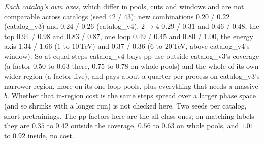 \documentclass[11pt]{article}
\begin{document}
\emph{Each catalog's own axes}, which differ in pools, cuts and windows and are not comparable across catalogs (seed
$42$ / $43$): new combinations $0.20$ / $0.22$ (catalog\_v3) and $0.24$ / $0.26$ (catalog\_v4), $2\to4$ $0.29$ /
$0.31$ and $0.46$ / $0.48$, the top $0.94$ / $0.98$ and $0.83$ / $0.87$, one loop $0.49$ / $0.45$ and $0.80$ /
$1.00$, the energy axis $1.34$ / $1.66$ ($1$ to $10$\,TeV) and $0.37$ / $0.36$ ($6$ to $20$\,TeV, above catalog\_v4's
window).
So at equal steps catalog\_v4 buys pp use outside catalog\_v3's coverage (a factor $0.50$ to $0.63$ there, $0.75$ to
$0.78$ on whole pools) and the whole of its own wider region (a factor five), and pays about a quarter per process on
catalog\_v3's narrower region, more on its one-loop pools, plus everything that needs a massive $b$. Whether that
in-region cost is the same steps spread over a larger phase space (and so shrinks with a longer run) is not checked
here. Two seeds per catalog, short pretrainings. The pp factors here are the all-class ones; on matching labels
they are $0.35$ to $0.42$ outside the coverage, $0.56$ to $0.63$ on whole pools, and $1.01$ to $0.92$ inside, no cost.
\end{document}
